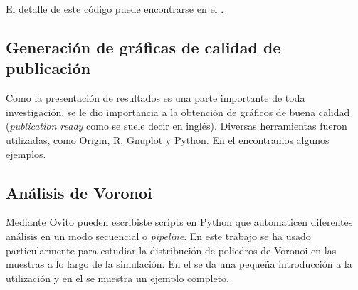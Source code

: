El detalle de este código puede encontrarse en el  .

\subsection{Generación de gráficas de calidad de publicación}

Como la presentación de resultados es una parte importante de toda investigación, se le dio importancia a la obtención de gráficos de buena calidad (\textit{publication ready} como se suele decir en inglés). Diversas herramientas fueron utilizadas, como \href{http://www.originlab.com}{Origin}, \href{https://www.r-project.org/}{R}, \href{http://www.gnuplot.info/}{Gnuplot} y \href{https://www.python.org/}{Python}. En el   encontramos algunos ejemplos.

\subsection{Análisis de Voronoi}

Mediante Ovito \citep{stukowski10} pueden escribiste scripts en Python que automaticen diferentes análisis en un modo secuencial o \textit{pipeline}. En este trabajo se ha usado particularmente para estudiar la distribución de poliedros de Voronoi en las muestras a lo largo de la simulación. En el  se da una pequeña introducción a la utilización y en el   se muestra un ejemplo completo.